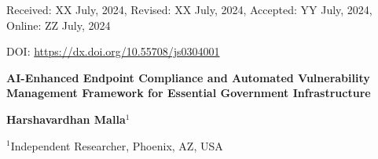 \documentclass[10pt]{article} %
\begin{document}
\thispagestyle{firststyle}
\setcounter{page}{1}

\noindent Received: XX July, 2024, Revised: XX July, 2024, Accepted: YY July, 2024, Online: ZZ July, 2024

\vspace{0.2cm}
\noindent DOI: \href{https://dx.doi.org/10.55708/js0304001}{https://dx.doi.org/10.55708/js0304001}
\vspace{0.7in}

\noindent \textbf{\LARGE{\setlength\itemsep{0pt}AI-Enhanced Endpoint Compliance and Automated Vulnerability Management Framework for Essential Government Infrastructure}}

\vspace{0.2cm}

\noindent \textbf{Harshavardhan Malla${}^{1}$}
\vspace{0.1cm}

\begin{footnotesize}
\noindent ${}^{1}$Independent Researcher, Phoenix, AZ, USA

\end{footnotesize}

\vspace{0.2in}
\end{document}
